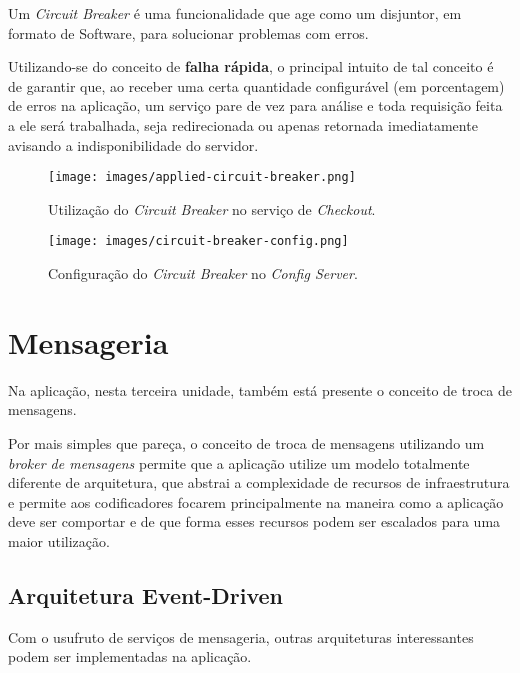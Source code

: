 \documentclass[12pt, openright, oneside, a4paper, article,
  section=TITLE
]{abntex2}
\begin{document}
Um \textit{Circuit Breaker} é uma funcionalidade que age como um disjuntor, em formato de Software, para solucionar problemas com erros.

Utilizando-se do conceito de \textbf{falha rápida}, o principal intuito de tal conceito é de garantir que, ao receber uma certa quantidade configurável (em porcentagem) de erros na aplicação, um serviço pare de vez para análise e toda requisição feita a ele será trabalhada, seja redirecionada ou apenas retornada imediatamente avisando a indisponibilidade do servidor.

\begin{figure}[htb]
  \begin{center}
    \texttt{[image: images/applied-circuit-breaker.png]}
  \end{center}
  \caption{Utilização do \textit{Circuit Breaker} no serviço de \textit{Checkout}.}
\end{figure}

\begin{figure}[htb]
  \begin{center}
    \texttt{[image: images/circuit-breaker-config.png]}
  \end{center}
  \caption{Configuração do \textit{Circuit Breaker} no \textit{Config Server}.}
\end{figure}

\section{Mensageria}

Na aplicação, nesta terceira unidade, também está presente o conceito de troca de mensagens.

Por mais simples que pareça, o conceito de troca de mensagens utilizando um \textit{broker de mensagens} permite que a aplicação utilize um modelo totalmente diferente de arquitetura, que abstrai a complexidade de recursos de infraestrutura e permite aos codificadores focarem principalmente na maneira como a aplicação deve ser comportar e de que forma esses recursos podem ser escalados para uma maior utilização.

\subsection{Arquitetura Event-Driven}

Com o usufruto de serviços de mensageria, outras arquiteturas interessantes podem ser implementadas na aplicação.
\end{document}
